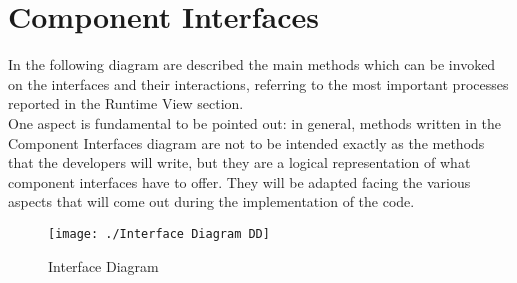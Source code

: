 \section{Component Interfaces} 
In the following diagram are described the main methods which can be invoked on the interfaces and their interactions, referring to the most important processes reported in the Runtime View section.\\
One aspect is fundamental to be pointed out: in general, methods written in the Component Interfaces diagram are not to be intended exactly as the methods that the developers will write, but they are a logical representation of what component interfaces have to offer. They will be adapted facing the various aspects that will come out during the implementation of the code.
\begin{figure}[H]
\centerline{\texttt{[image: ./Interface Diagram DD]}}
\caption{Interface Diagram}
\end{figure}






 
 